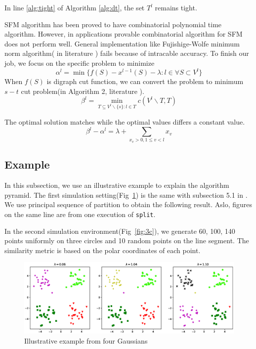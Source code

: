 \documentclass{article}
\theoremstyle{definition}
\begin{document}
In line \ref{alg:tight} of Algorithm \ref{alg:dt}, the set $T^l$ remains tight.

SFM algorithm has been proved to have combinatorial polynomial time algorithm. However, in applications provable combinatorial algorithm for SFM does not perform well. General implementation like Fujishige-Wolfe minimum norm algorithm( in literature \cite{fwrobust}) fails because of intracable accuracy.
To finish our job, we focus on the specific problem to minimize 
\begin{equation}
\alpha^l = \min \{ f(S) - x^{l-1}(S) - \lambda: l \in \forall S \subset V^l\}
\end{equation}
When $f(S)$ is digraph cut function, we can convert the problem to minimum $s-t$ cut problem(in Algorithm 2, literature \cite{pin}). 
\begin{equation}
\beta^l = \min_{T \subseteq V^l \backslash \{s\}: l \in T} c(V^l \backslash T, T)
\end{equation} 

The optimal solution matches while the optimal values differs a constant value. 
\begin{equation}
\beta^l - \alpha^l = \lambda + \sum_{x_v>0, 1\leq v<l}x_{v}
\end{equation} 
\subsection{Example}

In this subsection, we use an illustrative example to explain the algorithm pyramid.
The first simulation setting(Fig~\ref{fig:4p}) is the same with subsection 5.1 in \cite{mac}.  We use principal sequence of partition to obtain the following result.
Aslo, figures on the same line are from one execution of \texttt{split}.

In the second simulation environment(Fig~\ref{fig:3c}), we generate 60, 100, 140 points uniformly on three circles and 10 random points on the line segment. The similarity metric is based on the polar coordinates of each point.

\begin{figure}[!ht]
\includegraphics[width=12cm]{pic/4part.eps}
\caption{Illustrative example from four Gaussians}\label{fig:4p}
\end{figure}
\end{document}
